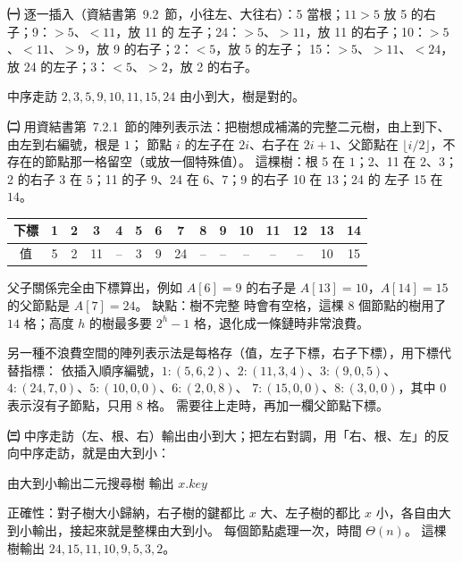 \begin{pastsoln}
\textbf{㈠} 逐一插入（資結書第~9.2~節，小往左、大往右）：5 當根；$11 > 5$ 放 5 的右子；9：$> 5$、$< 11$，放 11 的
左子；24：$> 5$、$> 11$，放 11 的右子；10：$> 5$、$< 11$、$> 9$，放 9 的右子；2：$< 5$，放 5 的左子；
15：$> 5$、$> 11$、$< 24$，放 24 的左子；3：$< 5$、$> 2$，放 2 的右子。
\begin{center}
\end{center}
中序走訪 $2, 3, 5, 9, 10, 11, 15, 24$ 由小到大，樹是對的。

\textbf{㈡} 用資結書第~7.2.1~節的陣列表示法：把樹想成補滿的完整二元樹，由上到下、由左到右編號，根是 $1$；
節點 $i$ 的左子在 $2i$、右子在 $2i + 1$、父節點在 $\lfloor i/2 \rfloor$，不存在的節點那一格留空（或放一個特殊值）。
這棵樹：根 5 在 $1$；2、11 在 $2$、$3$；2 的右子 3 在 $5$；11 的子 9、24 在 $6$、$7$；9 的右子 10 在 $13$；24 的
左子 15 在 $14$。
\begin{center}
\small
\setlength{\tabcolsep}{4pt}
\begin{tabular}{c|cccccccccccccc}
下標 & 1 & 2 & 3 & 4 & 5 & 6 & 7 & 8 & 9 & 10 & 11 & 12 & 13 & 14 \\
\hline
值 & 5 & 2 & 11 & -- & 3 & 9 & 24 & -- & -- & -- & -- & -- & 10 & 15 \\
\end{tabular}
\end{center}
父子關係完全由下標算出，例如 $A[6] = 9$ 的右子是 $A[13] = 10$，$A[14] = 15$ 的父節點是 $A[7] = 24$。 缺點：樹不完整
時會有空格，這棵 $8$ 個節點的樹用了 $14$ 格；高度 $h$ 的樹最多要 $2^h - 1$ 格，退化成一條鏈時非常浪費。

另一種不浪費空間的陣列表示法是每格存（值，左子下標，右子下標），用下標代替指標：
依插入順序編號，$1{:}(5, 6, 2)$、$2{:}(11, 3, 4)$、$3{:}(9, 0, 5)$、$4{:}(24, 7, 0)$、$5{:}(10, 0, 0)$、$6{:}(2, 0, 8)$、
$7{:}(15, 0, 0)$、$8{:}(3, 0, 0)$，其中 $0$ 表示沒有子節點，只用 $8$ 格。 需要往上走時，再加一欄父節點下標。

\textbf{㈢} 中序走訪（左、根、右）輸出由小到大；把左右對調，用「右、根、左」的反向中序走訪，就是由大到小：
\begin{pseudo}{由大到小輸出二元搜尋樹}
        \State {} 
        \State 輸出 $x.\mathit{key}$
        \State {} 
    \EndIf
\EndProcedure
\end{pseudo}
正確性：對子樹大小歸納，右子樹的鍵都比 $x$ 大、左子樹的都比 $x$ 小，各自由大到小輸出，接起來就是整棵由大到小。
每個節點處理一次，時間 $\Theta(n)$。 這棵樹輸出 $24, 15, 11, 10, 9, 5, 3, 2$。


\end{pastsoln}
